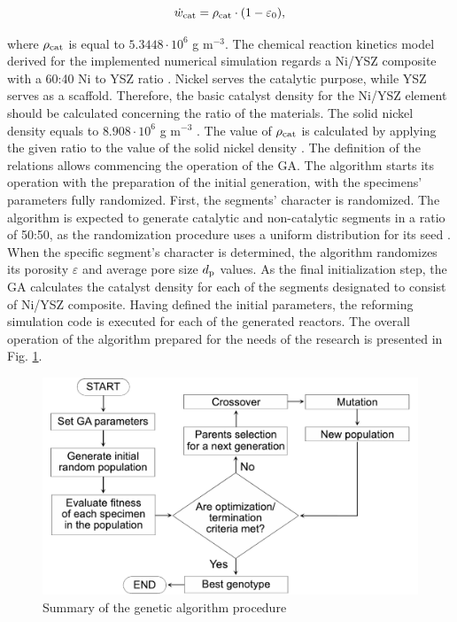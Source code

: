 \documentclass[preprint,12pt]{elsarticle}
\begin{document}
\begin{equation}
\label{eq:cat_dens}
\dot{w}_{\rm{cat}} = \rho_{\rm{cat}} \cdot (1-\varepsilon_{\rm{0}}),
\end{equation}

\noindent where $\rho_{\rm{cat}}$ is equal to $5.3448 \cdot 10^6$ g m$^{-3}$. The chemical reaction kinetics model derived for the implemented numerical simulation regards a Ni/YSZ composite with a 60:40 Ni to YSZ ratio \cite{Pajak2021IJHEa}. Nickel serves the catalytic purpose, while YSZ serves as a scaffold. Therefore, the basic catalyst density for the Ni/YSZ element should be calculated concerning the ratio of the materials. The solid nickel density equals to $8.908 \cdot 10^6$ g m$^{-3}$ \cite{Everhart2012}. The value of $\rho_{\rm{cat}}$ is calculated by applying the given ratio to the value of the solid nickel density \cite{Pajak2021IJHEa}.  The definition of the relations allows commencing the operation of the GA. The algorithm starts its operation with the preparation of the initial generation, with the specimens' parameters fully randomized. First, the segments' character is randomized. The algorithm is expected to generate catalytic and non-catalytic segments in a ratio of 50:50, as the randomization procedure uses a uniform distribution for its seed \cite{Jerrum1986}.  When the specific segment's character is determined, the algorithm randomizes its porosity  $\varepsilon$ and average pore size $d_{\rm{p}}$ values. As the final initialization step, the GA calculates the catalyst density for each of the segments designated to consist of Ni/YSZ composite. Having defined the initial parameters, the reforming simulation code is executed for each of the generated reactors.  The overall operation of the algorithm prepared for the needs of the research is presented in Fig. \ref{fig:ga}. 

\begin{figure}[h]
\centering
\includegraphics[width=120mm]{block_ga.eps}\hspace{2pc}
\caption{\label{fig:ga} Summary of the genetic algorithm procedure}
\end{figure}
\end{document}
